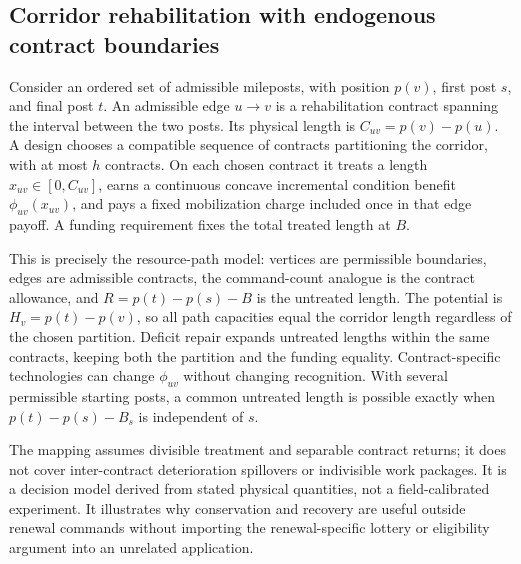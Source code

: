 \subsection{Corridor rehabilitation with endogenous contract boundaries}\label{sec:corridor60}
Consider an ordered set of admissible mileposts, with position $p(v)$, first post $s$, and final post $t$. An admissible edge $u\to v$ is a rehabilitation contract spanning the interval between the two posts. Its physical length is $C_{uv}=p(v)-p(u)$. A design chooses a compatible sequence of contracts partitioning the corridor, with at most $h$ contracts. On each chosen contract it treats a length $x_{uv}\in[0,C_{uv}]$, earns a continuous concave incremental condition benefit $\phi_{uv}(x_{uv})$, and pays a fixed mobilization charge included once in that edge payoff. A funding requirement fixes the total treated length at $B$.

This is precisely the resource-path model: vertices are permissible boundaries, edges are admissible contracts, the command-count analogue is the contract allowance, and $R=p(t)-p(s)-B$ is the untreated length. The potential is $H_v=p(t)-p(v)$, so all path capacities equal the corridor length regardless of the chosen partition. Deficit repair expands untreated lengths within the same contracts, keeping both the partition and the funding equality. Contract-specific technologies can change $\phi_{uv}$ without changing recognition. With several permissible starting posts, a common untreated length is possible exactly when $p(t)-p(s)-B_s$ is independent of $s$.

The mapping assumes divisible treatment and separable contract returns; it does not cover inter-contract deterioration spillovers or indivisible work packages. It is a decision model derived from stated physical quantities, not a field-calibrated experiment. It illustrates why conservation and recovery are useful outside renewal commands without importing the renewal-specific lottery or eligibility argument into an unrelated application.
